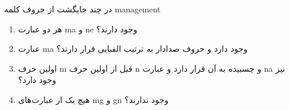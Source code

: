 \p
در چند جایگشت از حروف کلمه management
  \begin{enumerate}
    \item
    هر دو عبارت ma و ne وجود دارند؟
    \item
    عبارت ma وجود دارد و حروف صدادار به ترتیب الفبایی قرار دارند؟
    \item
    اولین حرف m قبل از اولین حرف n و چسبیده به آن قرار دارد و عبارت na نیز وجود دارد؟
    \item
    هیچ یک از عبارت‌های mg و gn وجود ندارند؟
  \end{enumerate}